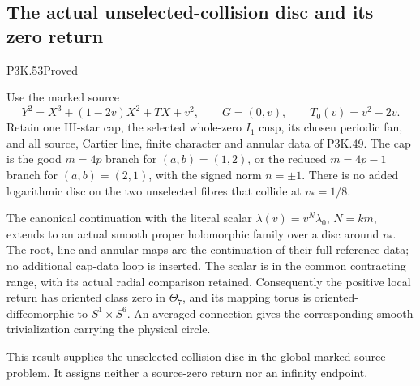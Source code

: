 \subsection{The actual unselected-collision disc and its zero return}
\begin{statement}{P3K.53}{Proved}

Use the marked source
\[
 Y^2=X^3+(1-2v)X^2+TX+v^2,\qquad G=(0,v),
 \qquad T_0(v)=v^2-2v.
\]
Retain one III-star cap, the selected whole-zero \(I_1\) cusp,
its chosen periodic fan, and all source, Cartier line, finite
character and annular data of P3K.49. The cap is the good
\(m=4p\) branch for \((a,b)=(1,2)\), or the reduced
\(m=4p-1\) branch for \((a,b)=(2,1)\), with the signed norm
\(n=\pm1\). There is no added logarithmic disc on the two
unselected fibres that collide at \(v_*=1/8\).

The canonical continuation with the literal scalar
\(\lambda(v)=v^N\lambda_0\), \(N=km\), extends to an actual
smooth proper holomorphic family over a disc around \(v_*\).
The root, line and annular maps are the continuation of their
full reference data; no additional cap-data loop is inserted.
The scalar is in the common contracting range, with its
actual radial comparison retained. Consequently the positive
local return has oriented class zero in \(\Theta_7\), and
its mapping torus is oriented-diffeomorphic to \(S^1\times S^6\).
An averaged connection gives the corresponding smooth
trivialization carrying the physical circle.

This result supplies the unselected-collision disc in the
global marked-source problem. It assigns neither a
source-zero return nor an infinity endpoint.

\end{statement}
